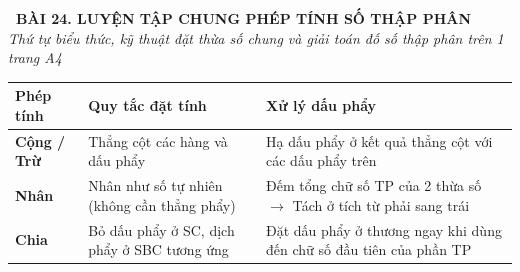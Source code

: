 \documentclass[14pt,a4paper,oneside]{extbook}
\begin{document}
\noindent
\begin{tcolorbox}[
  enhanced,
  colback=teal!8!white,
  colframe=teal!80!black,
  arc=3mm,
  boxrule=1.1pt,
  width=\linewidth,
  halign=center,
  top=2.2mm, bottom=2.2mm,
  left=3mm, right=3mm,
  drop fuzzy shadow
]
  {\large\bfseries\color{teal!95!black}\faBookmark\ BÀI 24. LUYỆN TẬP CHUNG PHÉP TÍNH SỐ THẬP PHÂN}\\[2pt]
  {\scriptsize\color{black!75}\itshape Thứ tự biểu thức, kỹ thuật đặt thừa số chung và giải toán đố số thập phân trên 1 trang A4}
\end{tcolorbox}

\vspace{3.2mm}
\noindent
\begin{tcolorbox}[
  enhanced,
  title={\footnotesize\bfseries\color{white}\faCalculator\ 1. Tổng kết nhanh quy tắc 4 phép tính với số thập phân},
  colback=blue!2!white,
  colframe=blue!75!black,
  arc=2.5mm, boxrule=0.8pt, top=1.8mm, bottom=1.8mm, left=2.5mm, right=2.5mm
]
  \scriptsize
  \centering
  \begin{tabular}{|l|l|l|}
    \hline
    \textbf{Phép tính} & \textbf{Quy tắc đặt tính} & \textbf{Xử lý dấu phẩy} \\ \hline
    \textbf{Cộng / Trừ} & Thẳng cột các hàng và dấu phẩy & Hạ dấu phẩy ở kết quả thẳng cột với các dấu phẩy trên \\ \hline
    \textbf{Nhân} & Nhân như số tự nhiên (không cần thẳng phẩy) & Đếm tổng chữ số TP của 2 thừa số $\rightarrow$ Tách ở tích từ phải sang trái \\ \hline
    \textbf{Chia} & Bỏ dấu phẩy ở SC, dịch phẩy ở SBC tương ứng & Đặt dấu phẩy ở thương ngay khi dùng đến chữ số đầu tiên của phần TP \\ \hline
  \end{tabular}
\end{tcolorbox}

\vspace{3mm}
\end{document}
